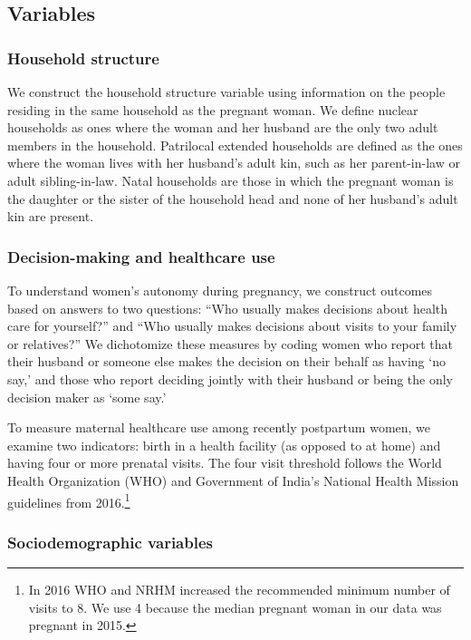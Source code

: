 \documentclass[10pt,twoside,reqno]{article}
\begin{document}
\subsection*{Variables}

\subsubsection*{Household structure} \label{sec:def_hhstruc}
We construct the household structure variable using information on the people residing in the same household as the pregnant woman. We define nuclear households as ones where the woman and her husband are the only two adult members in the household. Patrilocal extended households are defined as the ones where the woman lives with her husband’s adult kin, such as her parent-in-law or adult sibling-in-law. Natal households are those in which the pregnant woman is the daughter or the sister of the household head and none of her husband’s adult kin are present. 

\subsubsection*{Decision-making and healthcare use} \label{sec:outcomes}
To understand women's autonomy during pregnancy, we construct outcomes based on answers to two questions: ``Who usually makes decisions about health care for yourself?'' and ``Who usually makes decisions about visits to your family or relatives?'' We dichotomize these measures by coding women who report that their husband or someone else makes the decision on their behalf as having ‘no say,’ and those who report deciding jointly with their husband or being the only decision maker as ‘some say.’

To measure maternal healthcare use among recently postpartum women, we examine two indicators: birth in a health facility (as opposed to at home) and having four or more prenatal visits. The four visit threshold follows the World Health Organization (WHO) and Government of India’s National Health Mission guidelines from 2016.\footnote{In 2016 WHO and NRHM increased the recommended minimum number of visits to 8.  We use 4 because the median pregnant woman in our data was pregnant in 2015.}

\subsubsection*{Sociodemographic variables}  
\end{document}
